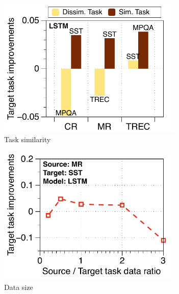 \begin{figure}[!t]
	\centering
	\begin{subfigure}[b]{0.33\textwidth}
		\centering
		\includegraphics[width=0.975\textwidth]{figures/task_sim_norm_lstm.pdf}
		\caption{Task similarity}
		\label{fig_ab_sim}
	\end{subfigure}%
	\begin{subfigure}[b]{0.33\textwidth}
		\centering
		\includegraphics[width=0.975\textwidth]{figures/ratio_norm_sst_trec_lstm.pdf}
		\caption{Data size}
		\label{fig_ab_data}
	\end{subfigure}
	\begin{subfigure}[b]{0.33\textwidth}
		\centering

\end{subfigure}
\end{figure}
